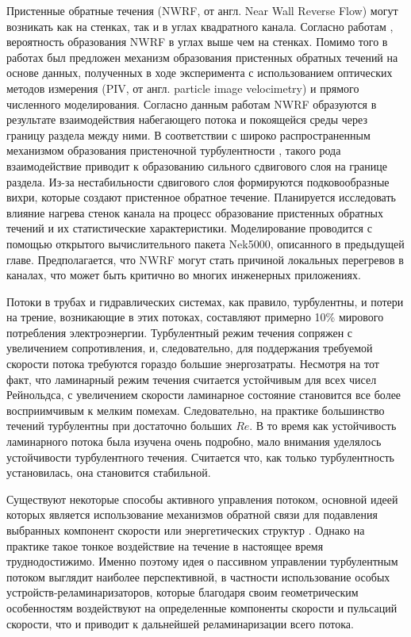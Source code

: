Пристенные обратные течения (NWRF, от англ. Near Wall Reverse Flow) могут возникать как на стенках, 
так и в углах квадратного канала. 
%
Согласно работам \cite{zaripov2021mechanism, zaripov2021reverse, ivashchenko2021effect}, 
вероятность образования NWRF в углах выше чем на стенках. 
%
Помимо того в работах \cite{zaripov2021mechanism, zaripov2021reverse} был предложен механизм 
образования пристенных обратных течений на основе данных, полученных в ходе эксперимента 
с использованием оптических методов измерения (PIV, от англ. particle image velocimetry) 
и прямого численного моделирования. 
%
Согласно данным работам NWRF образуются в результате взаимодействия набегающего потока и 
покоящейся среды через границу раздела между ними. 
%
В соответствии с широко распространенным механизмом образования пристеночной 
турбулентности \cite{robinson1991coherent}, такого рода взаимодействие приводит к 
образованию сильного сдвигового слоя на границе раздела. 
%
Из-за нестабильности сдвигового слоя формируются подковообразные вихри, 
которые создают пристенное обратное течение.
%
Планируется исследовать влияние нагрева стенок канала на процесс образование пристенных обратных течений 
и их статистические характеристики. 
%
Моделирование проводится с помощью открытого вычислительного пакета Nek5000, описанного в предыдущей главе. 
%
Предполагается, что NWRF могут стать причиной локальных перегревов в каналах, 
что может быть критично во многих инженерных приложениях.



Потоки в трубах и гидравлических системах, как правило, турбулентны, и потери на трение, 
возникающие в этих потоках, составляют примерно 10\% мирового потребления электроэнергии. 
%
Турбулентный режим течения сопряжен с увеличением сопротивления, и, следовательно, 
для поддержания требуемой скорости потока требуются гораздо большие энергозатраты. 
%
Несмотря на тот факт, что ламинарный режим течения считается устойчивым для всех чисел Рейнольдса, 
с увеличением скорости ламинарное состояние становится все более восприимчивым к мелким помехам. 
%
Следовательно, на практике большинство течений турбулентны при достаточно больших $Re$. 
%
В то время как устойчивость ламинарного потока была изучена очень подробно, 
мало внимания уделялось устойчивости турбулентного течения. 
%
Считается что, как только турбулентность установилась, она становится стабильной.
%


Существуют некоторые способы активного управления потоком, основной идеей которых 
является использование механизмов обратной связи для подавления выбранных компонент 
скорости или энергетических структур \cite{kuhnen2018destabilizing,kuhnen2019relaminarization}. 
%
Однако на практике такое тонкое воздействие на течение в настоящее время труднодостижимо. 
%
Именно поэтому идея о пассивном управлении турбулентным потоком выглядит наиболее перспективной, 
в частности использование особых устройств-реламинаризаторов, которые благодаря своим геометрическим 
особенностям воздействуют на определенные компоненты скорости и пульсаций скорости, 
что и приводит к дальнейшей реламинаризации всего потока.

